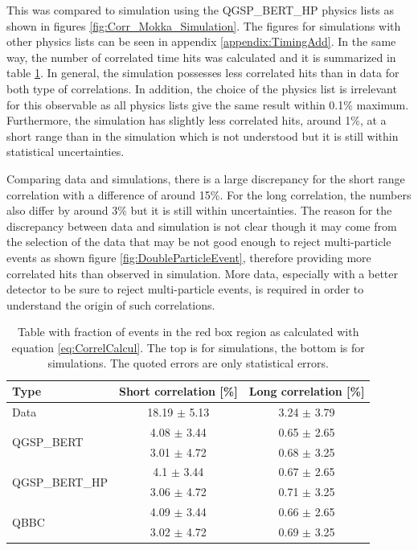 This was compared to simulation using the QGSP\_BERT\_HP physics lists as shown in figures \ref{fig:Corr_Mokka_Simulation}. The figures for simulations with other physics lists can be seen in appendix \ref{appendix:TimingAdd}. In the same way, the number of correlated time hits was calculated and it is summarized in table \ref{table:Correlation_DataSim}. In general, the simulation possesses less correlated hits than in data for both type of correlations. In addition, the choice of the physics list is irrelevant for this observable as all physics lists give the same result within 0.1\% maximum. Furthermore, the \ddhep simulation has slightly less correlated hits, around 1\%, at a short range than in the \mokka simulation which is not understood but it is still within statistical uncertainties.

Comparing data and simulations, there is a large discrepancy for the short range correlation with a difference of around 15\%. For the long correlation, the numbers also differ by around 3\% but it is still within uncertainties. The reason for the discrepancy between data and simulation is not clear though it may come from the selection of the data that may be not good enough to reject multi-particle events as shown figure \ref{fig:DoubleParticleEvent}, therefore providing more correlated hits than observed in simulation. More data, especially with a better detector to be sure to reject multi-particle events, is required in order to understand the origin of such correlations.

\begin{table}[htb!]
	\centering
	\caption{Table with fraction of events in the red box region as calculated with equation \ref{eq:CorrelCalcul}. The top is for \mokka simulations, the bottom is for \ddhep simulations. The quoted errors are only statistical errors.}
	\label{table:Correlation_DataSim}
	\begin{tabular}{@{} lcc @{}}
		\toprule
		Type & Short correlation [\%] & Long correlation [\%]\\
		\midrule
		\multirow{2}{*}{Data} & \multirow{2}{*}{18.19 $\pm$ 5.13} & \multirow{2}{*}{3.24 $\pm$ 3.79}\\ & &\\
		\midrule
		\multirow{2}{*}{QGSP\_BERT} & 4.08 $\pm$ 3.44 & 0.65 $\pm$ 2.65\\ & 3.01 $\pm$ 4.72 & 0.68 $\pm$ 3.25\\
		\multirow{2}{*}{QGSP\_BERT\_HP} & 4.1 $\pm$ 3.44 & 0.67 $\pm$ 2.65\\ & 3.06 $\pm$ 4.72 & 0.71 $\pm$ 3.25\\
		\multirow{2}{*}{QBBC} & 4.09 $\pm$ 3.44 & 0.66 $\pm$ 2.65\\ & 3.02 $\pm$ 4.72 & 0.69 $\pm$ 3.25\\
		\bottomrule
	\end{tabular}
\end{table}

